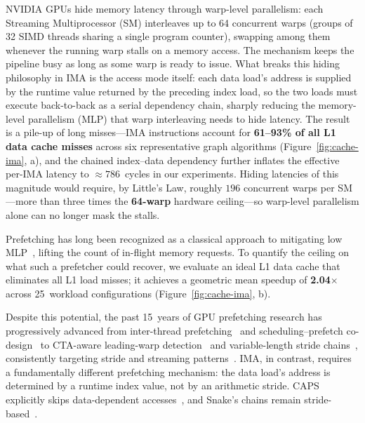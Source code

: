 \documentclass[sigconf, screen, review]{acmart}
\begin{document}
NVIDIA GPUs hide memory latency through warp-level parallelism: each
Streaming Multiprocessor (SM) interleaves up to 64 concurrent warps
(groups of 32 SIMD threads sharing a single program counter),
swapping among them whenever the running warp stalls on a memory
access.
The mechanism keeps the pipeline busy as long as some warp is ready
to issue.
What breaks this hiding philosophy in IMA is the access mode itself:
each data load's address is supplied by the runtime value returned
by the preceding index load, so the two loads must execute
back-to-back as a serial dependency chain, sharply reducing the
memory-level parallelism (MLP) that warp interleaving needs to hide
latency.
The result is a pile-up of long misses---IMA instructions account
for \textbf{61--93\% of all L1 data cache misses} across six
representative graph algorithms (Figure~\ref{fig:cache-ima}, a),
and the chained index--data dependency further inflates the
effective per-IMA latency to $\approx 786$~cycles in our experiments.
Hiding latencies of this magnitude would require, by Little's Law,
roughly $196$ concurrent warps per SM---more than three times the
\textbf{64-warp} hardware ceiling---so warp-level parallelism alone
can no longer mask the stalls.

Prefetching has long been recognized as a classical approach to
mitigating low MLP~\cite{jouppi1990stream, mowry1992software,
lee2010manythread, jog2013orchestrated}, lifting the count of
in-flight memory requests.
To quantify the ceiling on what such a prefetcher could recover, we
evaluate an ideal L1 data cache that eliminates all L1 load misses;
it achieves a geometric mean speedup of \textbf{2.04$\times$} across
25~workload configurations (Figure~\ref{fig:cache-ima}, b).

Despite this potential, the past 15~years of GPU prefetching
research has progressively advanced from inter-thread
prefetching~\cite{lee2010manythread} and scheduling--prefetch
co-design~\cite{jog2013orchestrated} to CTA-aware leading-warp
detection~\cite{koo2018caps} and variable-length stride
chains~\cite{mostofi2023snake}, consistently targeting stride and
streaming patterns~\cite{oh2016apres, oh2018wasp}.
IMA, in contrast, requires a fundamentally different prefetching mechanism:
the data load's address is determined by a runtime index value, not
by an arithmetic stride.
CAPS explicitly skips data-dependent
accesses~\cite{koo2018caps}, and Snake's chains remain
stride-based~\cite{mostofi2023snake}.
\end{document}

